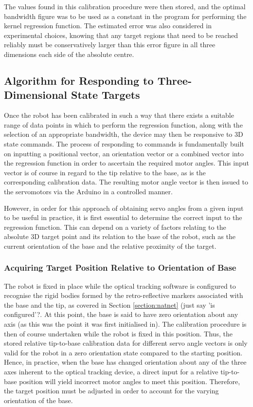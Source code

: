 \documentclass[11pt]{article}
\begin{document}
The values found in this calibration procedure were then stored, and the optimal bandwidth figure was to be used as a constant in the program for performing the kernel regression function. The estimated error was also considered in experimental choices, knowing that any target regions that need to be reached reliably must be conservatively larger than this error figure in all three dimensions each side of the absolute centre. 

\pagebreak 
\subsection{Algorithm for Responding to Three-Dimensional State Targets}
\label{section:algorithmForResponse}

Once the robot has been calibrated in such a way that there exists a suitable range of data points in which to perform the regression function, along with the selection of an appropriate bandwidth, the device may then be responsive to 3D state commands.
The process of responding to commands is fundamentally built on inputting a positional vector, an orientation vector or a combined vector into the regression function in order to ascertain the required motor angles. This input vector is of course in regard to the tip relative to the base, as is the corresponding calibration data. The resulting motor angle vector is then issued to the servomotors via the Arduino in a controlled manner. 

However, in order for this approach of obtaining servo angles from a given input to be useful in practice, it is first essential to determine the correct input to the regression function. This can depend on a variety of factors relating to the absolute 3D target point and its relation to the base of the robot, such as the current orientation of the base and the relative proximity of the target.

\subsubsection{Acquiring Target Position Relative to Orientation of Base}
\label{section:relativeToBaseOrientation}

The robot is fixed in place while the optical tracking software is configured to recognise the rigid bodies formed by the retro-reflective markers associated with the base and the tip, as covered in Section \ref{section:natnet} (just say 'is configured'?. At this point, the base is said to have zero orientation about any axis (as this was the point it was first initialised in). The calibration procedure is then of course undertaken while the robot is fixed in this position. Thus, the stored relative tip-to-base calibration data for different servo angle vectors is only valid for the robot in a zero orientation state compared to the starting position. Hence, in practice, when the base has changed orientation about any of the three axes inherent to the optical tracking device, a direct input for a relative tip-to-base position will yield incorrect motor angles to meet this position. Therefore, the target position must be adjusted in order to account for the varying orientation of the base.
\end{document}
